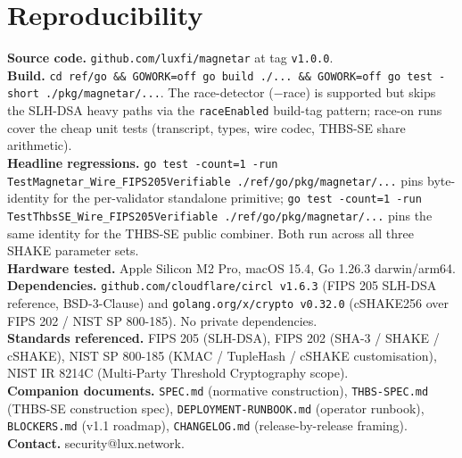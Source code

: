 \documentclass[11pt,a4paper]{article}
\begin{document}



\section*{Reproducibility}
\textbf{Source code.} \texttt{github.com/luxfi/magnetar} at tag
\texttt{v1.0.0}.\\
\textbf{Build.} \texttt{cd ref/go \&\& GOWORK=off go build ./... \&\&
GOWORK=off go test -short ./pkg/magnetar/...}. The race-detector
($-$race) is supported but skips the SLH-DSA heavy paths via the
\texttt{raceEnabled} build-tag pattern; race-on runs cover the cheap
unit tests (transcript, types, wire codec, THBS-SE share
arithmetic).\\
\textbf{Headline regressions.}
\texttt{go test -count=1 -run TestMagnetar\_Wire\_FIPS205Verifiable
./ref/go/pkg/magnetar/...} pins byte-identity for the per-validator
standalone primitive;
\texttt{go test -count=1 -run TestThbsSE\_Wire\_FIPS205Verifiable
./ref/go/pkg/magnetar/...} pins the same identity for the THBS-SE
public combiner. Both run across all three SHAKE parameter sets.\\
\textbf{Hardware tested.} Apple Silicon M2 Pro, macOS 15.4, Go
1.26.3 darwin/arm64.\\
\textbf{Dependencies.} \texttt{github.com/cloudflare/circl v1.6.3}
(FIPS 205 SLH-DSA reference, BSD-3-Clause) and
\texttt{golang.org/x/crypto v0.32.0} (cSHAKE256 over FIPS 202 / NIST
SP 800-185). No private dependencies.\\
\textbf{Standards referenced.} FIPS 205 (SLH-DSA), FIPS 202 (SHA-3 /
SHAKE / cSHAKE), NIST SP 800-185 (KMAC / TupleHash / cSHAKE
customisation), NIST IR 8214C \cite{nistir8214c} (Multi-Party
Threshold Cryptography scope).\\
\textbf{Companion documents.} \texttt{SPEC.md} (normative
construction), \texttt{THBS-SPEC.md} (THBS-SE construction spec),
\texttt{DEPLOYMENT-RUNBOOK.md} (operator runbook),
\texttt{BLOCKERS.md} (v1.1 roadmap), \texttt{CHANGELOG.md}
(release-by-release framing).\\
\textbf{Contact.} security@lux.network.
\end{document}
